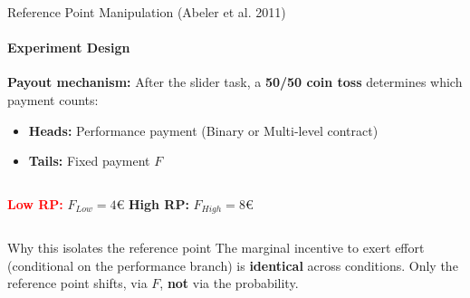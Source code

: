 \documentclass{beamer}
\begin{document}
\begin{frame}{Reference Point Manipulation (Abeler et al. 2011)}
\framesubtitle{Experiment Design}

\textbf{Payout mechanism:} After the slider task, a \textbf{50/50 coin toss} 
determines which payment counts:
\begin{itemize}
    \item \textbf{Heads:} Performance payment (Binary or Multi-level contract)
    \item \textbf{Tails:} Fixed payment $F$
\end{itemize}

\vspace{0.3cm}

\begin{columns}[T]
\textbf{\textcolor{red}{Low RP:}} $F_{Low} = 4\text{€}$
\textbf{\textcolor{green!50!black}{High RP:}} $F_{High} = 8\text{€}$
\end{columns}

\vspace{0.4cm}

\begin{exampleblock}{Why this isolates the reference point}
The marginal incentive to exert effort (conditional on the performance branch) is \textbf{identical} across conditions. Only the reference point shifts, via $F$, \textbf{not} via the 
probability.
\end{exampleblock}

\end{frame}
\end{document}
